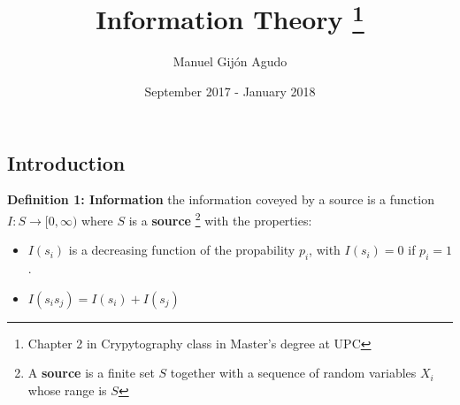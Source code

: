 \documentclass{article}
\title{Information Theory \thanks{Chapter 2 in Crypytography class in Master's degree at UPC}}
\author{Manuel Gijón Agudo }
\date{September 2017 - January 2018}
\begin{document}
	\begin{titlepage}
		\maketitle{} \newpage
		
		\tableofcontents
		\newpage
		
		\section{Introduction}
		\noindent\textbf{Definition 	1: Information} the information coveyed by a source is a function $I:S  \rightarrow [ 0, \infty ) $ where $S$ is a \textbf{source} \footnote{A \textbf{source} is a finite set $S$ together with a sequence of random variables $X_i$ whose range is $S$} with the properties:
		
		\begin{itemize}
			\item $I(s_i)$ is a decreasing function of the propability $p_i$, with $I(s_i) = 0$ if $p_i = 1$.
			\item $I(s_i s_j) = I(s_i) + I(s_j)$
		\end{itemize}
		
	\end{titlepage}
\end{document}

